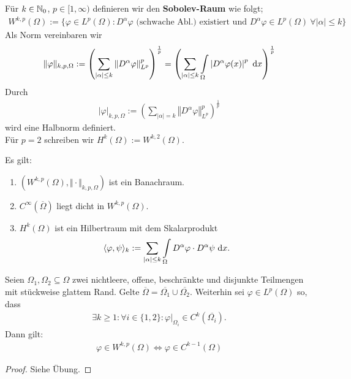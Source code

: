 \begin{definition}
Für $k\in\mathbb{N}_0$, $p\in[1,\infty)$ definieren wir den \textbf{Sobolev-Raum} wie folgt;
\begin{align}
W^{k,p}(\Omega):=\Big\lbrace\varphi\in L^p(\Omega):D^\alpha\varphi\text{ (schwache Abl.) existiert und }D^\alpha\varphi\in L^p(\Omega)~\forall|\alpha|\leq k\Big\rbrace
\end{align}
Als Norm vereinbaren wir
\begin{align*}
\Vert\varphi\Vert_{k,p,\Omega}:=\left(\sum\limits_{|\alpha|\leq k}\left\Vert D^\alpha\varphi\right\Vert^p_{L^p}\right)^{\frac{1}{p}}
=\left(\sum\limits_{|\alpha|\leq k}\int\limits_\Omega\left| D^\alpha\varphi(x)\right|^p\text{ d} x\right)^{\frac{1}{p}}
\end{align*}
Durch
\begin{align*}
|\varphi|_{k,p,\Omega}:=\left(\sum\limits_{|\alpha|= k}\left\Vert D^\alpha\varphi\right\Vert^p_{L^p}\right)^{\frac{1}{p}}
\end{align*}
wird eine Halbnorm definiert.\\
Für $p=2$ schreiben wir $H^k(\Omega):=W^{k,2}(\Omega)$.
\end{definition}

\begin{satz}
Es gilt:
\begin{enumerate}
\item $\left(W^{k,p}(\Omega),\Vert\cdot\Vert_{k,p,\Omega}\right)$ ist ein Banachraum.
\item $C^\infty(\overline{\Omega})$ liegt dicht in $W^{k,p}(\Omega)$.
\item $H^k(\Omega)$ ist ein Hilbertraum mit dem Skalarprodukt
\begin{align*}
\langle \varphi,\psi\rangle_k:=\sum\limits_{|\alpha|\leq k}\int\limits_\Omega D^\alpha\varphi\cdot D^\alpha\psi\text{ d} x.
\end{align*}
\end{enumerate}
\end{satz}

\begin{satz}\label{satz1.4}\enter
Seien $\Omega_1,\Omega_2\subseteq\Omega$ zwei nichtleere, offene, beschränkte und disjunkte Teilmengen mit stückweise glattem Rand. Gelte
$\overline{\Omega}=\overline{\Omega_1}\cup\overline{\Omega_2}$.
Weiterhin sei $\varphi\in L^p(\Omega)$ so, dass 
\begin{align*}
\exists k\geq 1:\forall i\in\lbrace1,2\rbrace:\varphi|_{\Omega_i}\in C^k(\overline{\Omega_i}).
\end{align*}
Dann gilt:
\begin{align*}
\varphi\in W^{k,p}(\Omega)\Longleftrightarrow\varphi\in C^{k-1}(\Omega)
\end{align*}
\end{satz}
\begin{proof}
Siehe Übung.
\end{proof}

